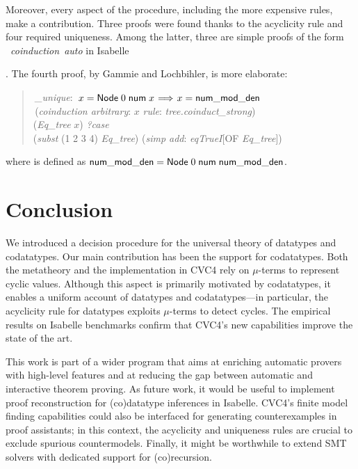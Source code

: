 Moreover, every aspect of the procedure, including the
more expensive rules, make a contribution.
%
Three proofs were found thanks to
the acyclicity rule and four required uniqueness. Among the latter,
three are simple proofs of the form
~\textit{coinduction}~\textit{auto}
in Isabelle\begin{rep} \cite{blanchette-et-al-2014-impl}\end{rep}.
The fourth proof, by Gammie and Lochbihler, is more elaborate:
%
\begin{quote}
 \,\textit{\nummodden\_unique}: \,$x = \const{Node}\;0\;\const{num}\; x \vthinspace\Longrightarrow\vthinspace x = \const{\nummodden}$ \\
 \,(\textit{coinduction arbitrary}: $x$ \textit{rule}: \textit{tree.coinduct\_strong}) \\
\noindent\hbox{}\quad  {} (\textit{Eq\_tree} $x$)  \textit{?case} \\
\noindent\hbox{}\qquad  {} (\textit{subst} (1 2 3 4) \textit{Eq\_tree}) (\textit{simp add}: \textit{eqTrueI}[OF \textit{Eq\_tree}]) \\
\end{quote}
%
\noindent
where \const{\nummodden} is defined as $\textsf{num\hbox{\rm\_}mod\hbox{\rm\_}den} =
\textsf{Node}\;0\;\textsf{num}\;\textsf{num\hbox{\rm\_}mod\hbox{\rm\_}den}$.

\section{Conclusion}
\label{sec:conclusion}

We introduced a decision procedure for the universal theory of datatypes and
codatatypes. Our main
contribution has been the support for codatatypes. Both the metatheory and
the implementation in CVC4 rely on $\mu$-terms to represent cyclic values.
Although this aspect is primarily motivated by codatatypes, it enables
a uniform account of datatypes and codatatypes---in particular,
the acyclicity rule for datatypes exploits $\mu$-terms to detect cycles.
The empirical results on Isabelle benchmarks
confirm that CVC4's new capabilities improve the state of the art.

This work is part of a wider program that aims at enriching automatic provers
with high-level features and at reducing the gap between automatic and
interactive theorem proving. As future work, it would be useful to implement
proof reconstruction for (co)data\-type inferences in Isabelle.
CVC4's finite model finding capabilities \cite{reynolds-et-al-2013} could also
be interfaced for generating counterexamples in proof assistants;
in this context, the acyclicity and uniqueness rules are
crucial to exclude spurious countermodels. Finally, it might be worthwhile to
extend SMT solvers with dedicated support for (co)recursion.

